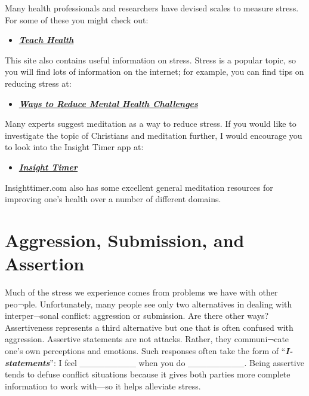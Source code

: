 \documentclass[
]{book}
\providecommand{\tightlist}{%
  \setlength{\itemsep}{0pt}\setlength{\parskip}{0pt}}
\begin{document}
Many health professionals and researchers have devised scales to measure stress. For some of these you might check out:

\begin{itemize}
\tightlist
\item
  \href{http://www.teachhealth.com/\#stressscale}{\textbf{\emph{Teach Health}}}
\end{itemize}

This site also contains useful information on stress. Stress is a popular topic, so you will find lots of information on the internet; for example, you can find tips on reducing stress at:

\begin{itemize}
\tightlist
\item
  \href{http://www.ehow.com/how_3830_reduce-stress-life.html}{\textbf{\emph{Ways to Reduce Mental Health Challenges}}}
\end{itemize}

Many experts suggest meditation as a way to reduce stress. If you would like to investigate the topic of Christians and meditation further, I would encourage you to look into the Insight Timer app at:

\begin{itemize}
\tightlist
\item
  \href{https://insighttimer.com/meditation-topics/christianity}{\textbf{\emph{Insight Timer}}}
\end{itemize}

Insighttimer.com also has some excellent general meditation resources for improving one's health over a number of different domains.

\hypertarget{aggression-submission-and-assertion}{%
\section{Aggression, Submission, and Assertion}\label{aggression-submission-and-assertion}}

Much of the stress we experience comes from problems we have with other peo¬ple. Unfortunately, many people see only two alternatives in dealing with interper¬sonal conflict: aggression or submission. Are there other ways?
Assertiveness represents a third alternative but one that is often confused with aggression. Assertive statements are not attacks. Rather, they communi¬cate one's own perceptions and emotions. Such responses often take the form of ``\textbf{\emph{I-statements}}'': I feel \_\_\_\_\_\_\_\_\_ when you do \_\_\_\_\_\_\_\_\_. Being assertive tends to defuse conflict situations because it gives both parties more complete information to work with---so it helps alleviate stress.
\end{document}
